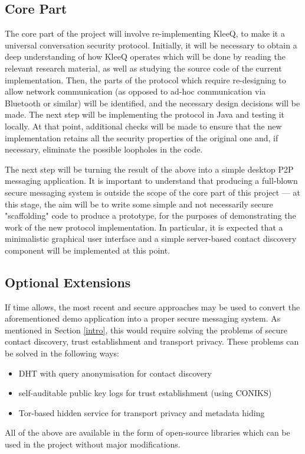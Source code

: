\documentclass[a4paper, twoside, 12pt]{report}
\begin{document}
\begin{appendices}
\subsection{Core Part}
The core part of the project will involve re-implementing KleeQ, to make it a universal conversation security protocol. Initially, it will be necessary to obtain a deep understanding of how KleeQ operates which will be done by reading the relevant research material, as well as studying the source code of the current implementation. Then, the parts of the protocol which require re-designing to allow network communication (as opposed to ad-hoc communication via Bluetooth or similar) will be identified, and the necessary design decisions will be made. The next step will be implementing the protocol in Java and testing it locally. At that point, additional checks will be made to ensure that the new implementation retains all the security properties of the original one and, if necessary, eliminate the possible loopholes in the code.

\vspace{\baselineskip}
\noindent
The next step will be turning the result of the above into a simple desktop P2P messaging application. It is important to understand that producing a full-blown secure messaging system is outside the scope of the core part of this project --- at this stage, the aim will be to write some simple and not necessarily secure "scaffolding" code to produce a prototype, for the purposes of demonstrating the work of the new protocol implementation. In particular, it is expected that a minimalistic graphical user interface and a simple server-based contact discovery component will be implemented at this point.


\subsection{Optional Extensions}
If time allows, the most recent and secure approaches may be used to convert the aforementioned demo application into a proper secure messaging system. As mentioned in Section \ref{intro}, this would require solving the problems of secure contact discovery, trust establishment and transport privacy. These problems can be solved in the following ways:
\begin{itemize}
    \item DHT with query anonymisation for contact discovery
    \item self-auditable public key logs for trust establishment (using CONIKS)
    \item Tor-based hidden service for transport privacy and metadata hiding
\end{itemize}
All of the above are available in the form of open-source libraries which can be used in the project without major modifications.


\end{appendices}
\end{document}
